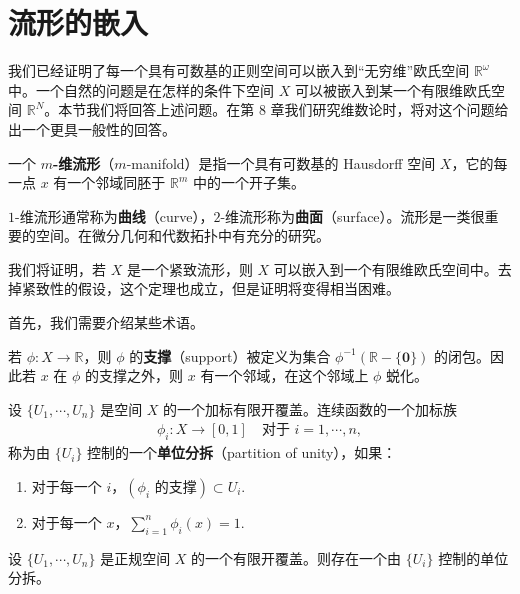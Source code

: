 \section{流形的嵌入}\label{section:ch04-manifold-embedding}

我们已经证明了每一个具有可数基的正则空间可以嵌入到``无穷维''欧氏空间 $\mathbb{R}^{\omega}$ 中。一个自然的问题是在怎样的条件下空间 $X$ 可以被嵌入到某一个有限维欧氏空间 $\mathbb{R}^{N}$。本节我们将回答上述问题。在第 8 章我们研究维数论时，将对这个问题给出一个更具一般性的回答。

\begin{definition}\label{definition:ch04-manifold}
一个 $m$\textbf{-维流形}（$m$-manifold）是指一个具有可数基的 Hausdorff 空间 $X$，它的每一点 $x$ 有一个邻域同胚于 $\mathbb{R}^{m}$ 中的一个开子集。
\end{definition}

$1$-维流形通常称为\textbf{曲线}（curve），$2$-维流形称为\textbf{曲面}（surface）。流形是一类很重要的空间。在微分几何和代数拓扑中有充分的研究。

我们将证明，若 $X$ 是一个紧致流形，则 $X$ 可以嵌入到一个有限维欧氏空间中。去掉紧致性的假设，这个定理也成立，但是证明将变得相当困难。

首先，我们需要介绍某些术语。

若 $\phi\colon X\to\mathbb{R}$，则 $\phi$ 的\textbf{支撑}（support）被定义为集合 $\phi^{-1}(\mathbb{R}-\{\boldsymbol{0}\})$ 的闭包。因此若 $x$ 在 $\phi$ 的支撑之外，则 $x$ 有一个邻域，在这个邻域上 $\phi$ 蜕化。

\begin{definition}\label{definition:ch04-partition-of-unity}
设 $\{U_{1},\cdots,U_{n}\}$ 是空间 $X$ 的一个加标有限开覆盖。连续函数的一个加标族
\begin{align*}
\phi_{i}\colon X\longrightarrow[0,1]\quad\text{对于 }i=1,\cdots,n,
\end{align*}
称为由 $\{U_{i}\}$ 控制的一个\textbf{单位分拆}（partition of unity），如果：
\begin{enumerate}
\item 对于每一个 $i$，$(\phi_{i}\text{ 的支撑})\subset U_{i}$.
\item 对于每一个 $x$，$\sum_{i=1}^{n}\phi_{i}(x)=1$.
\end{enumerate}
\end{definition}

\begin{theorem}[有限单位分拆的存在性]\label{theorem:ch04-partition-of-unity}
设 $\{U_{1},\cdots,U_{n}\}$ 是正规空间 $X$ 的一个有限开覆盖。则存在一个由 $\{U_{i}\}$ 控制的单位分拆。
\end{theorem}


